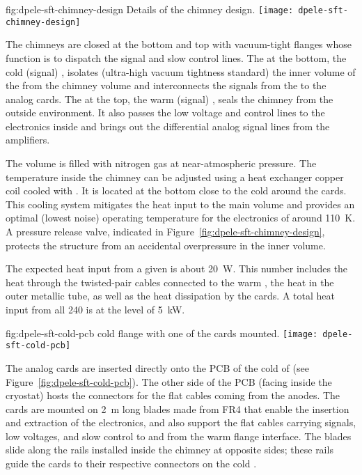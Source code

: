 \begin{dunefigure}{fig:dpele-sft-chimney-design}
{Details of the  chimney design.}
\texttt{[image: dpele-sft-chimney-design]}
\end{dunefigure}

The chimneys are closed at the bottom and top with vacuum-tight \fdth flanges whose function is to dispatch the signal and slow control lines. The \fdth at the bottom, the cold (signal) \fdth, isolates (ultra-high vacuum tightness standard) the inner volume of the  from the chimney volume and interconnects the signals from the  to the analog  cards. The \fdth at the top, the warm (signal) \fdth, seals the chimney from the outside environment. It also passes the low voltage and control lines to the  electronics inside and brings out the differential analog signal lines from the  amplifiers. 

The  volume is filled with nitrogen gas at near-atmospheric pressure. The temperature inside the chimney can be adjusted using a heat exchanger copper coil cooled with \lar. It is located at the bottom close to the cold \fdth around the  cards. %
This cooling system %
mitigates the heat input to the main  volume and provides an optimal (lowest noise) operating temperature for the  electronics of around \SI{110}{K}. A pressure release valve, indicated in Figure~\ref{fig:dpele-sft-chimney-design}, protects the structure from an accidental overpressure in the inner volume. 

The expected heat input from a given  is about \SI{20}{\watt}. This number includes the heat through the twisted-pair cables connected to the warm \fdth, the heat in the   outer metallic tube, as well as the heat dissipation by the  cards. A total heat input from all \num{240}  is at the level of \SI{5}{\kilo\watt}. 

\begin{dunefigure}{fig:dpele-sft-cold-pcb}
{ cold \fdth flange with one of the  cards mounted.}
\texttt{[image: dpele-sft-cold-pcb]}
\end{dunefigure}
The analog  cards are inserted directly onto the PCB of the cold \fdth of 
(see Figure~\ref{fig:dpele-sft-cold-pcb}). The other side of the PCB (facing inside the cryostat) hosts the connectors for the flat cables coming from the  anodes.  The  cards are mounted on \SI{2}{\m} long blades made from FR4 that enable the insertion and extraction of the electronics, and also support the flat cables carrying signals, low voltages, and slow control to and from the warm flange interface.  The blades slide along the rails installed inside the chimney at opposite sides; %
these rails guide the  cards to their respective connectors on the cold \fdth. 

